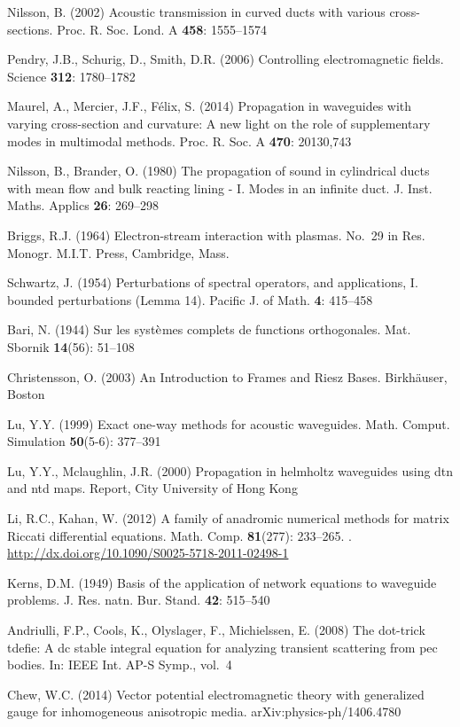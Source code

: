 \documentclass{svjour3}
\begin{document}
\begin{thebibliography}{10}
Nilsson, B. (2002) Acoustic transmission in curved ducts with various
  cross-sections.
\newblock Proc. R. Soc. Lond. A \textbf{458}: 1555--1574

Pendry, J.B., Schurig, D., Smith, D.R. (2006) Controlling electromagnetic
  fields.
\newblock Science \textbf{312}: 1780--1782

Maurel, A., Mercier, J.F., F\'elix, S. (2014) Propagation in waveguides with
  varying cross-section and curvature: A new light on the role of supplementary
  modes in multimodal methods.
\newblock Proc. R. Soc. A \textbf{470}: 20130,743

Nilsson, B., Brander, O. (1980) The propagation of sound in cylindrical ducts
  with mean flow and bulk reacting lining - {I}. {M}odes in an infinite duct.
\newblock J. Inst. Maths. Applics \textbf{26}: 269--298

Briggs, R.J. (1964) Electron-stream interaction with plasmas.
\newblock No.~29 in Res. Monogr. M.I.T. Press, Cambridge, Mass.

Schwartz, J. (1954) Perturbations of spectral operators, and applications,
  {I}. bounded perturbations ({L}emma 14).
\newblock Pacific J. of Math. \textbf{4}: 415--458

Bari, N. (1944) Sur les syst${\rm \grave{e}}$mes complets de functions
  orthogonales.
\newblock Mat. {S}bornik \textbf{14}(56): 51--108

Christensson, O. (2003) An {I}ntroduction to {F}rames and {R}iesz {B}ases.
\newblock Birkh\"{a}user, Boston

Lu, Y.Y. (1999) Exact one-way methods for acoustic waveguides.
\newblock Math. Comput. Simulation \textbf{50}(5-6): 377--391

Lu, Y.Y., Mclaughlin, J.R. (2000) Propagation in helmholtz waveguides using dtn and ntd maps.
\newblock Report, City University of Hong Kong

Li, R.C., Kahan, W. (2012) A family of anadromic numerical methods for matrix
  {R}iccati differential equations.
\newblock Math. Comp. \textbf{81}(277): 233--265.
\newblock {}.
\newblock \urlprefix\url{http://dx.doi.org/10.1090/S0025-5718-2011-02498-1}

Kerns, D.M. (1949) Basis of the application of network equations to waveguide
  problems.
\newblock J. Res. natn. Bur. Stand. \textbf{42}: 515--540

Andriulli, F.P., Cools, K., Olyslager, F., Michielssen, E. (2008) The dot-trick
  tdefie: A dc stable integral equation for analyzing transient scattering from
  pec bodies.
\newblock In: IEEE Int. AP-S Symp., vol.~4

Chew, W.C. (2014) Vector potential electromagnetic theory with generalized gauge for inhomogeneous anisotropic media.
\newblock arXiv:physics-ph/1406.4780

\end{thebibliography}
\end{document}
